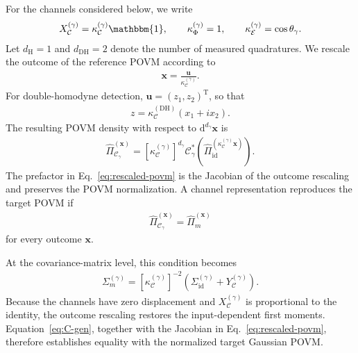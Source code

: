 \documentclass[%
final, 
superscriptaddress,
 amsmath,amssymb,amsfonts,
 aps,
 pra,
 longbibliography,
]{revtex4-2}
\newcommand{\ind}[1]{\mathrm{#1}}
\newcommand{\dd}{\mathrm{d}}
\begin{document}
For the channels considered below, we write
\begin{align}
  X_{\mathcal{C}}^{(\gamma)}
  =
  \kappa_{\mathcal{C}}^{(\gamma)}\mathbbm{1},
  \qquad
  \kappa_{\Phi}^{(\gamma)}=1,
  \qquad
  \kappa_{\mathcal{E}}^{(\gamma)}=\cos\theta_{\gamma}.
\end{align}
Let $d_{\ind{H}}=1$ and $d_{\ind{DH}}=2$ denote the number of measured quadratures. We rescale the outcome of the reference POVM according to
\begin{align}
  \boldsymbol{x}
  =
  \frac{\boldsymbol{u}}
  {\kappa_{\mathcal{C}}^{(\gamma)}}.
\end{align}
For double-homodyne detection,
$\boldsymbol{u}=(z_1,z_2)^{\ind{T}}$, so that
\begin{align}
  z
  =
  \kappa_{\mathcal{C}}^{(\ind{DH})}
  (x_1+i x_2).
\end{align}
The resulting POVM density with respect to
$\dd^{d_{\gamma}}\boldsymbol{x}$ is
\begin{align}
  \label{eq:rescaled-povm}
  \hat{\Pi}_{\mathcal{C}_{\gamma}}^{(\boldsymbol{x})}
  =
  \left[
    \kappa_{\mathcal{C}}^{(\gamma)}
  \right]^{d_{\gamma}}
  \mathcal{C}_{\gamma}^{*}
  \left(
    \hat{\Pi}_{\ind{id}}^{
      \left(
        \kappa_{\mathcal{C}}^{(\gamma)}
        \boldsymbol{x}
      \right)
    }
  \right).
\end{align}
The prefactor in Eq.~\eqref{eq:rescaled-povm} is the Jacobian of the outcome rescaling and preserves the POVM normalization. A channel representation reproduces the target POVM if
\begin{align}
  \hat{\Pi}_{\mathcal{C}_{\gamma}}^{(\boldsymbol{x})}
  =
  \hat{\Pi}_{m}^{(\boldsymbol{x})}
\end{align}
for every outcome $\boldsymbol{x}$.

At the covariance-matrix level, this condition becomes
\begin{align}
  \label{eq:C-gen}
  \Sigma_m^{(\gamma)}
  =
  \left[
    \kappa_{\mathcal{C}}^{(\gamma)}
  \right]^{-2}
  \left(
    \Sigma_{\ind{id}}^{(\gamma)}
    +
    Y_{\mathcal{C}}^{(\gamma)}
  \right).
\end{align}
Because the channels have zero displacement and
$X_{\mathcal{C}}^{(\gamma)}$ is proportional to the identity, the outcome rescaling restores the input-dependent first moments. Equation~\eqref{eq:C-gen}, together with the Jacobian in Eq.~\eqref{eq:rescaled-povm}, therefore establishes equality with the normalized target Gaussian POVM.
\end{document}
